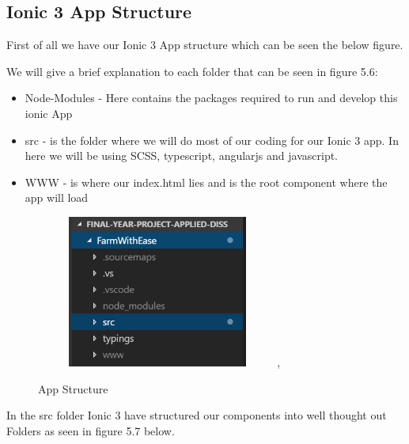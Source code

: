 \documentclass[12pt,a4paper,oneside,openany]{book}
\begin{document}
\subsection{Ionic 3 App Structure}
First of all we have our Ionic 3 App structure which can be seen the below figure.


We will give a brief explanation to each folder that can be seen in figure 5.6:

\begin{itemize}
    \item Node-Modules - Here contains the packages required to run and develop this ionic App
    \item src - is the folder where we will do most of our coding for our Ionic 3 app. In here we will be using SCSS, typescript, angularjs and javascript.
    \item WWW - is where our index.html lies and is the root component where the app will load
\end{itemize}
\begin{figure}[ht]
\renewcommand\thefigure{5.6}
\centering
\includegraphics[width=8cm,height=5cm]{Images/app.png},
\caption{App Structure}
\label{app}
\end{figure}

In the src folder Ionic 3 have structured our components into well thought out Folders as seen in ﬁgure 5.7 below.
\end{document}
